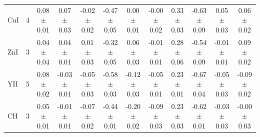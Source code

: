 \documentclass[oneside]{emulateapj}
\begin{document}
\begin{table}
\begin{tabular}{lccccccccccc}
CuI & 4 & 0.08 $\pm$ 0.01 & 0.07 $\pm$ 0.03 & -0.02 $\pm$ 0.02 & -0.47 $\pm$ 0.05 & 0.00 $\pm$ 0.01 & -0.00 $\pm$ 0.02 & 0.33 $\pm$ 0.03 & -0.63 $\pm$ 0.09 & 0.05 $\pm$ 0.03 & 0.06 $\pm$ 0.02 \\
ZnI & 3 & 0.04 $\pm$ 0.04 & 0.04 $\pm$ 0.01 & 0.01 $\pm$ 0.03 & -0.32 $\pm$ 0.05 & 0.06 $\pm$ 0.03 & -0.01 $\pm$ 0.01 & 0.28 $\pm$ 0.06 & -0.54 $\pm$ 0.09 & -0.01 $\pm$ 0.01 & 0.09 $\pm$ 0.02 \\
YII & 5 & 0.08 $\pm$ 0.02 & -0.03 $\pm$ 0.01 & -0.05 $\pm$ 0.03 & -0.58 $\pm$ 0.03 & -0.12 $\pm$ 0.03 & -0.05 $\pm$ 0.01 & 0.23 $\pm$ 0.01 & -0.67 $\pm$ 0.04 & -0.05 $\pm$ 0.03 & -0.09 $\pm$ 0.02 \\
CH & 3 & 0.05 $\pm$ 0.01 & -0.01 $\pm$ 0.01 & -0.07 $\pm$ 0.02 & -0.44 $\pm$ 0.01 & -0.20 $\pm$ 0.02 & -0.09 $\pm$ 0.03 & 0.23 $\pm$ 0.03 & -0.62 $\pm$ 0.01 & -0.03 $\pm$ 0.03 & -0.00 $\pm$ 0.03 \\
\hline       
\end{tabular}
\end{table}
\end{document}
